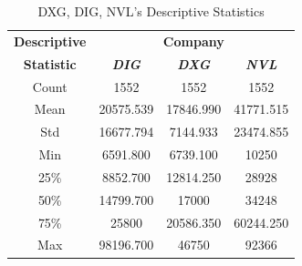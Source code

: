 \documentclass[conference]{IEEEtran}
\begin{document}
\begin{table}[htbp]
\caption{DXG, DIG, NVL’s Descriptive Statistics}
\begin{center}
\begin{tabular}{|c|c|c|c|}
\hline
\textbf{Descriptive}&\multicolumn{3}{|c|}{\textbf{Company}} \\
\cline{2-4}
\textbf{Statistic} & \textbf{\textit{DIG}}& \textbf{\textit{DXG}}& \textbf{\textit{NVL}} \\
\hline
Count & 1552 & 1552 & 1552  \\
\hline
Mean & 20575.539 & 17846.990 & 41771.515\\
\hline
Std & 16677.794 & 7144.933 & 23474.855\\
\hline
Min & 6591.800 & 6739.100 & 10250\\
\hline
25\% & 8852.700 & 12814.250 & 28928\\
\hline
50\% & 14799.700 & 17000 & 34248\\
\hline
75\% & 25800 & 20586.350 & 60244.250\\
\hline
Max & 98196.700 & 46750 & 92366\\
\hline
\end{tabular}
\label{tab1}
\end{center}
\end{table}
\end{document}
